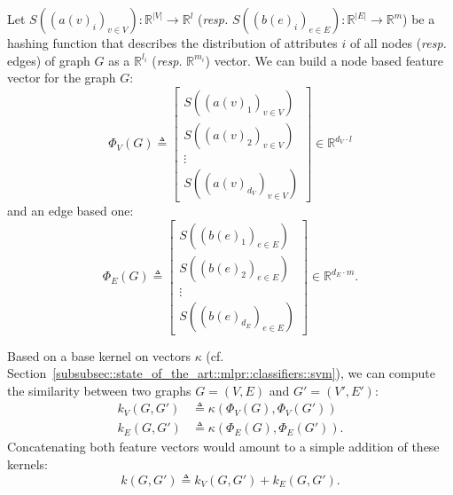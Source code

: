                 Let $S\left(\left(a(v)_i\right)_{v\in V}\right): \mathbb{R}^{\vert V\vert} \rightarrow \mathbb{R}^l$ (\textit{resp.} $S\left(\left(b(e)_i\right)_{e\in E}\right): \mathbb{R}^{\vert E\vert} \rightarrow \mathbb{R}^{m}$) be a hashing function that describes the distribution of attributes $i$ of all nodes (\textit{resp.} edges) of graph $G$ as a $\mathbb{R}^{l_i}$ (\textit{resp.} $\mathbb{R}^{m_i}$) vector.
                We can build a node based feature vector for the graph $G$:
                \begin{equation}
                    \label{eq::feature_node_graph}
                    \Phi_V(G) \triangleq \begin{bmatrix}
                        S\left(\left(a(v)_1\right)_{v\in V}\right)\\
                        S\left(\left(a(v)_2\right)_{v\in V}\right)\\
                        \vdots\\
                        S\left(\left(a(v)_{d_V}\right)_{v\in V}\right)
                    \end{bmatrix} \in \mathbb{R}^{d_V \cdot l}
                \end{equation}
                and an edge based one:
                \begin{equation}
                    \label{eq::feature_edge_graph}
                    \Phi_E(G) \triangleq \begin{bmatrix}
                        S\left(\left(b(e)_1\right)_{e \in E}\right)\\
                        S\left(\left(b(e)_2\right)_{e \in E}\right)\\
                        \vdots\\
                        S\left(\left(b(e)_{d_E}\right)_{e \in E}\right)
                    \end{bmatrix} \in \mathbb{R}^{d_E \cdot m}.
                \end{equation}

                Based on a base kernel on vectors $\kappa$ (cf. Section~\ref{subsubsec::state_of_the_art::mlpr::classifiers::svm}), we can compute the similarity between two graphs $G = \left(V, E\right)$ and $G' = \left(V', E'\right)$:
                \begin{align}
                    \label{eq::feature_graph_kernel_nodes}
                    k_V(G, G') &\triangleq \kappa(\Phi_V(G), \Phi_V(G'))\\
                    \label{eq::feature_graph_kernel_edges}
                    k_E(G, G') &\triangleq \kappa(\Phi_E(G), \Phi_E(G')).
                \end{align}
                Concatenating both feature vectors would amount to a simple addition of these kernels:
                \begin{equation}
                    \label{eq::feature_graph_kernel_sum}
                    k(G, G') \triangleq k_V(G, G') + k_E(G, G').
                \end{equation}

